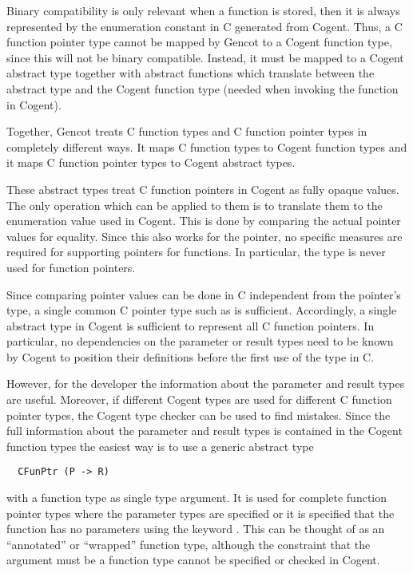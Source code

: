 Binary compatibility is only relevant when a function is stored, then it is always represented by the enumeration
constant in C generated from Cogent. Thus, a C function pointer type cannot be mapped by Gencot to a Cogent function type,
since this will not be binary compatible. Instead, it must be mapped to a Cogent abstract type together with 
abstract functions which translate between the abstract type and the Cogent function type (needed when invoking 
the function in Cogent).

Together, Gencot treats C function types and C function pointer types in completely different ways. It maps
C function types to Cogent function types and it maps C function pointer types to Cogent abstract types.

These abstract types treat C function pointers in Cogent as fully opaque values. The only operation which can 
be applied to them is to translate them to the enumeration value used in Cogent. This is done by comparing the
actual pointer values for equality. Since this also works for the  pointer, no specific measures
are required for supporting  pointers for functions. In particular, the type  is never
used for function pointers.

Since comparing pointer values can be done in C independent from the pointer's type, a single 
common C pointer type such as  is sufficient. Accordingly, a single abstract type in Cogent is
sufficient to represent all C function pointers. In particular, no dependencies on the parameter or result types 
need to be known by Cogent to position their definitions before the first use of the type in C. 

However, for the developer the information about the parameter and result types are useful. Moreover, if different
Cogent types are used for different C function pointer types, the Cogent type checker can be used to find
mistakes. Since the full information about the parameter and result types is contained in the Cogent function types
the easiest way is to use a generic abstract type
\begin{verbatim}
  CFunPtr (P -> R)
\end{verbatim}
with a function type  as single type argument. It is used for complete function pointer types where the 
parameter types are specified or it is specified that the function has no parameters using the keyword . 
This can be thought of as an ``annotated'' or ``wrapped'' function type, although the constraint that the argument
must be a function type cannot be specified or checked in Cogent.

